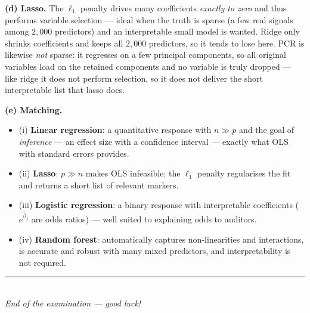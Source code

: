\documentclass[11pt,a4paper]{article}
\begin{document}
\begin{solutionbox}
\medskip
\textbf{(d) Lasso.}
The $\ell_1$ penalty drives many coefficients \emph{exactly to zero} and thus performs variable
selection --- ideal when the truth is sparse (a few real signals among $2{,}000$ predictors) and
an interpretable small model is wanted. Ridge only shrinks coefficients and keeps all $2{,}000$
predictors, so it tends to lose here. PCR is likewise \emph{not} sparse: it regresses on a few
principal components, so all original variables load on the retained components and no variable
is truly dropped --- like ridge it does not perform selection, so it does not deliver the short
interpretable list that lasso does.

\medskip
\textbf{(e) Matching.}
\begin{itemize}[nosep,leftmargin=5mm]
  \item (i) \textbf{Linear regression}: a quantitative response with $n\gg p$ and the goal of
    \emph{inference} --- an effect size with a confidence interval --- exactly what OLS with
    standard errors provides.
  \item (ii) \textbf{Lasso}: $p\gg n$ makes OLS infeasible; the $\ell_1$ penalty regularises the
    fit and returns a short list of relevant markers.
  \item (iii) \textbf{Logistic regression}: a binary response with interpretable coefficients
    ($e^{\hat\beta_j}$ are odds ratios) --- well suited to explaining odds to auditors.
  \item (iv) \textbf{Random forest}: automatically captures non-linearities and interactions,
    is accurate and robust with many mixed predictors, and interpretability is not required.
\end{itemize}
\end{solutionbox}
\fi

\vspace{6mm}
\begin{center}
\rule{0.35\textwidth}{0.4pt}\\[1mm]
\textit{End of the examination --- good luck!}
\end{center}
\end{document}
